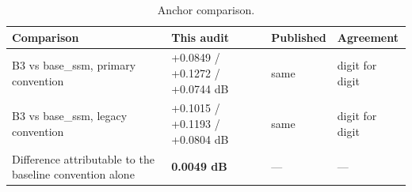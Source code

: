 \documentclass[pdflatex,sn-nature]{sn-jnl}
\newlength{\tblavail}
\begin{document}
\begin{table}[htbp]
\centering
\small
\setlength{\tabcolsep}{3pt}
\setlength{\tblavail}{\dimexpr\textwidth-8\tabcolsep\relax}
\begin{tabular}{p{0.388\tblavail}p{0.208\tblavail}p{0.187\tblavail}p{0.187\tblavail}}
\hline
Comparison & This audit & Published & Agreement \\
\hline
B3 vs base\_ssm, primary convention & +0.0849 / +0.1272 / +0.0744 dB & same & digit for digit \\
B3 vs base\_ssm, legacy convention & +0.1015 / +0.1193 / +0.0804 dB & same & digit for digit \\
Difference attributable to the baseline convention alone & \textbf{0.0049 dB} & --- & --- \\
\hline
\end{tabular}
\caption{Anchor comparison.}\label{tab:anchor}
\end{table}
\end{document}
